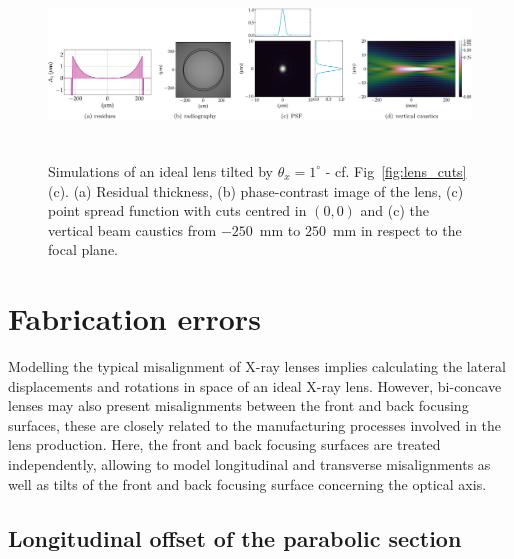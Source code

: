 \begin{refsection}
\begin{figure}[t]
        \centering
        {\includegraphics[height=4.19cm]{figures/ch04/tilted_CRL.pdf}}
        \caption[Effects of a CRL tilt]{Simulations of an ideal lens tilted by $\theta_x=1^{\circ}$ - cf. Fig~\ref{fig:lens_cuts}(c). (a) Residual thickness, (b) phase-contrast image of the lens, (c) point spread function with cuts centred in $(0,0)$ and (c) the vertical beam caustics from $-250$~mm to $250$~mm in respect to the focal plane. } \label{fig:tilted_CRL}
\end{figure}
\section{Fabrication errors}\label{sec:fabrication}

Modelling the typical misalignment of X-ray lenses implies calculating the lateral displacements and rotations in space of an ideal X-ray lens. However, bi-concave lenses may also present misalignments between the front and back focusing surfaces, these are closely related to the manufacturing processes involved in the lens production. Here, the front and back focusing surfaces are treated independently, allowing to model longitudinal and transverse misalignments as well as tilts of the front and back focusing surface concerning the optical axis.

\subsection{Longitudinal offset of the parabolic section}


\end{refsection}
